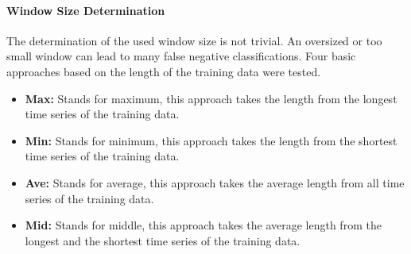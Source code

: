 \paragraph{Window Size Determination} \label{window_size_determination}
The determination of the used window size is not trivial. An oversized or too small window can lead to many false
negative classifications. Four basic approaches based on the length of the training data were tested.

\begin{itemize}
    \item \textbf{Max:} Stands for maximum, this approach takes the length from the longest time series of the training
        data.
    \item \textbf{Min:} Stands for minimum, this approach takes the length from the shortest time series of the training
        data.
    \item \textbf{Ave:} Stands for average, this approach takes the average length from all time series of the training
        data.
    \item \textbf{Mid:} Stands for middle, this approach takes the average length from the longest and the shortest time
        series of the training data.
\end{itemize}
